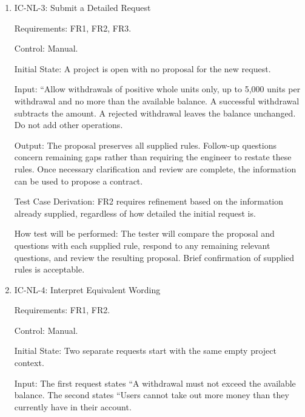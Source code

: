 \documentclass[12pt, titlepage]{article}
\begin{document}
\begin{enumerate}
Output: The draft preserves the withdrawal behaviour and balance restriction.
The system asks about missing rules, including permitted amounts and the
effect on the balance, before completing a contract that depends on those
rules.

Test Case Derivation: FR2 requires supplied information to be retained while
missing detail is obtained through interaction.

How test will be performed: The tester will submit the requirement and check
that the balance restriction is preserved and the missing rules are raised
rather than silently assumed.

\item{IC-NL-3: Submit a Detailed Request\\}

Requirements: FR1, FR2, FR3.

Control: Manual.

Initial State: A project is open with no proposal for the new request.

Input: ``Allow withdrawals of positive whole units only, up to 5,000 units per
withdrawal and no more than the available balance. A successful withdrawal
subtracts the amount. A rejected withdrawal leaves the balance unchanged. Do
not add other operations.

Output: The proposal preserves all supplied rules. Follow-up questions concern
remaining gaps rather than requiring the engineer to restate these rules. Once
necessary clarification and review are complete, the information can be used
to propose a contract.

Test Case Derivation: FR2 requires refinement based on the information already
supplied, regardless of how detailed the initial request is.

How test will be performed: The tester will compare the proposal and questions
with each supplied rule, respond to any remaining relevant questions, and
review the resulting proposal. Brief confirmation of supplied rules is
acceptable.

\item{IC-NL-4: Interpret Equivalent Wording\\}

Requirements: FR1, FR2.

Control: Manual.

Initial State: Two separate requests start with the same empty project
context.

Input: The first request states ``A withdrawal must not exceed the available
balance. The second states ``Users cannot take out more money than they
currently have in their account.


\end{enumerate}
\end{document}
